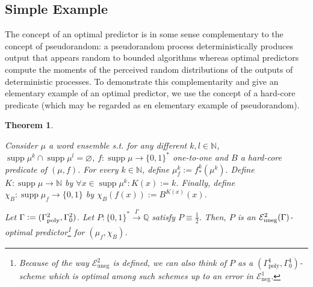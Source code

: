\documentclass{article}
\numberwithin{equation}{section}
\theoremstyle{definition}
\theoremstyle{plain}
\newtheorem{theorem}{Theorem}[section]
\newcommand{\Bool}{\{0,1\}}
\newcommand{\Words}{{\Bool^*}}
\DeclareMathOperator{\Supp}{supp}
\newcommand{\Nats}{\mathbb{N}}
\newcommand{\Rats}{\mathbb{Q}}
\newcommand{\Fall}{\mathcal{E}}
\newcommand{\Scheme}{\xrightarrow{\Gamma}}
\begin{document}
\subsection{Simple Example}
\label{sec:fundamentals__one_way}

The concept of an optimal predictor is in some sense complementary to the concept of pseudorandom: a pseudorandom process deterministically produces output that appears random to bounded algorithms whereas optimal predictors compute the moments of the perceived random distributions of the outputs of deterministic processes. To demonstrate this complementarity and give an elementary example of an optimal predictor, we use the concept of a hard-core predicate (which may be regarded as en elementary example of pseudorandom).

\begin{theorem}
\label{thm:hard_core}

Consider $\mu$ a word ensemble s.t. for any different $k,l \in \Nats$, $\Supp \mu^k \cap \Supp \mu^l = \varnothing$, $f: \Supp \mu \rightarrow \Words$ one-to-one and $B$ a hard-core predicate of $(\mu,f)$. For every $k \in \Nats$, define $\mu_f^k:=f_*^k(\mu^k).$ Define ${K: \Supp \mu \rightarrow \Nats}$ by $\forall x \in \Supp \mu^k: K(x):=k$. Finally, define $\chi_B: \Supp \mu_f \rightarrow \Bool$ by ${\chi_B(f(x)):=B^{K(x)}(x)}$.

Let $\Gamma:=(\Gamma_{\textnormal{poly}}^2,\Gamma_0^2)$. Let $P: \Words \Scheme \Rats$ satisfy $P \equiv \frac{1}{2}$. Then, $P$ is an $\Fall_{\textnormal{uneg}}^2(\Gamma)$-optimal predictor\footnote{Because of the way $\Fall_{\text{uneg}}^2$ is defined, we can also think of $P$ as a $(\Gamma_{\text{poly}}^1,\Gamma_0^1)$-scheme which is optimal among such schemes up to an error in $\Fall_{\text{neg}}^1$.} for $(\mu_f, \chi_B)$.

\end{theorem}
\end{document}
